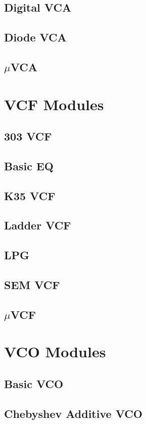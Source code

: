 \documentclass[11pt]{book}
\begin{document}
\section{Digital VCA}
\pagebreak
\section{Diode VCA}
\pagebreak
\section{$\mu$VCA}
\pagebreak

\chapter{VCF Modules}
\pagebreak
\section{303 VCF}
\pagebreak
\section{Basic EQ}
\pagebreak
\section{K35 VCF}
\pagebreak
\section{Ladder VCF}
\pagebreak
\section{LPG}
\pagebreak
\section{SEM VCF}
\pagebreak
\section{$\mu$VCF}
\pagebreak

\chapter{VCO Modules}
\pagebreak
\section{Basic VCO}
\pagebreak
\section{Chebyshev Additive VCO}
\pagebreak
\end{document}
